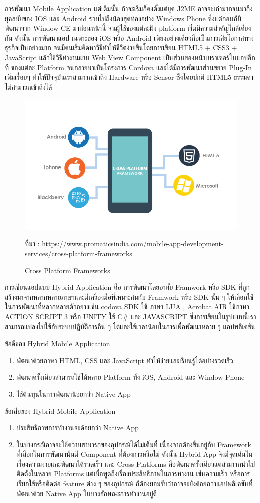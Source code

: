 การพัฒนา Mobile Application แต่เดิมนั้น ถ้าจะเริ่มก็คงตั้งแต่ยุค J2ME อาจจะเก่ามากจนมาถึงยุคสมัยของ IOS และ Android 
รวมไปถึงน้องสุดท้องอย่าง Windows Phone 
ซึ่งแต่ก่อนก็มีพัฒนาจาก Window CE มาก่อนหน้านี้ จนผู้ใช้ของแต่ละฝั่ง platform เริ่มมีความสำคัญใกล้เคียงกัน ดังนั้น การพัฒนาแอป
เฉพาะของ iOS หรือ Android เพียงอย่างเดียวถือเป็นการเสียโอกาสทางธุรกิจเป็นอย่างมาก จนมีคนเริ่มคิดหาวิธีทำให้ชีวิตง่ายขึ้นโดยการเขียน 
HTML5 + CSS3 + JavaScript แล้วใช้วิธีทำงานผ่าน Web View Component เป็นส่วนของหน้าเบราเซอร์ในแอปอีกที ของแต่ละ Platform 
จนกลายมาเป็นโครงการ Cordova และได้มีการพัฒนาส่วนขยาย Plug-In เพิ่มเรื่อยๆ ทำให้ปัจจุบันเราสามารถเข้าถึง Hardware หรือ Sensor 
ซึ่งโดยปกติ HTML5 ธรรมดาไม่สามารถเข้าถึงได้ 

\begin{figure}[H]
	\centering
	\includegraphics[width=0.5\columnwidth]{Figures/2/hybrid2}
	\caption{Cross Platform Frameworks}{ที่มา :  https://www.promaticsindia.com/mobile-app-development-services/cross-platform-frameworks}
	\label{Fig:hybrid2}
\end{figure}

การเขียนแอปแบบ Hybrid Application คือ การพัฒนาโดยอาศัย Framwork หรือ SDK 
ที่ถูกสร้างมาจากหลากหลายภาษาและมีเครื่องมือที่เหมาะสมกับ Framwork หรือ SDK นั้น ๆ ให้เลือกใช้ในการพัฒนาที่หลากหลายตัวอย่างเช่น 
codova SDK ใช้ ภาษา LUA , Acrobat AIR ใช้ภาษา ACTION SCRIPT 3 หรือ UNITY ใช้ C# และ JAVASCRIPT 
ซึ่งการเขียนในรูปแบบนี้เราสามารถแปลงไปใช้กับระบบปฏิบัติการอื่น ๆ ได้และใช้เวลาน้อยในการเพื่อพัฒนาหลาย ๆ แอปพลิเคชัน

	ข้อดีของ Hybrid Mobile Application
	\begin{enumerate}[label=\arabic*)]
		\item พัฒนาด้วยภาษา HTML, CSS และ JavaScript ทำให้ง่ายและเรียนรู้ได้อย่างรวดเร็ว
		\item พัฒนาครั้งเดียวสามารถใช้ได้หลาย Platform ทั้ง iOS, Android และ Window Phone
		\item ใช้ต้นทุนในการพัฒนาน้อยกว่า Native App
	\end{enumerate}

	ข้อเสียของ Hybrid Mobile Application
	\begin{enumerate}[label=\arabic*)]
		\item ประสิทธิภาพการทำงานจะด้อยกว่า Native App
		\item ในบางกรณีอาจจะใช้ความสามารถของอุปกรณ์ได้ไม่เต็มที่ เนื่องจากต้องขึ้นอยู่กับ Framework ที่เลือกในการพัฒนานั้นมี Component ที่ต้องการหรือไม่
		ดังนั้น Hybrid App จึงมีจุดเด่นในเรื่องความง่ายและพัฒนาได้รวดเร็ว และ Cross-Platforms คือพัฒนาครั้งเดียวแต่สามารถนำไปติดตั้งในหลาย Platforms แต่เมื่อพูดถึงเรื่องประสิทธิภาพในการทำงาน เช่นความเร็ว หรือการเรียกใช้หรือติดต่อ feature ต่าง ๆ ของอุปกรณ์ ก็ต้องยอมรับว่าอาจจะยังด้อยกว่าแอปพลิเคชันที่พัฒนาด้วย Native App ในบางลักษณะการทำงานอยู่ดี
	\end{enumerate}

